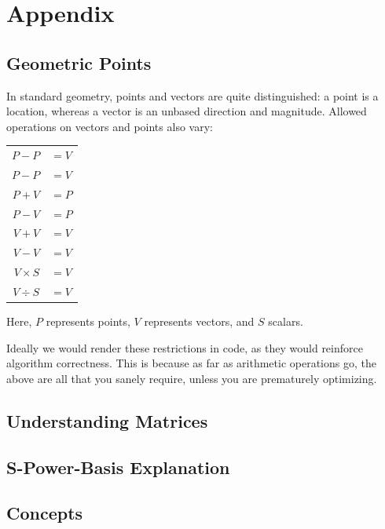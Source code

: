 \documentclass[openany]{book}
\begin{document}
\chapter{Appendix}
\renewcommand{\thesection}{\Alph{section}}

\section{Geometric Points}
In standard geometry, points and vectors are quite distinguished: a
point is a location, whereas a vector is an unbased direction and
magnitude.  Allowed operations on vectors and points also vary:

\begin{tabular}{r l}
  $P - P$ & $= V$ \\

  $P - P$ & $= V$ \\

  $P + V$ & $= P$ \\

  $P - V$ & $= P$ \\

  $V + V$ & $= V$ \\

  $V - V$ & $= V$ \\

  $V \times S$ & $= V$ \\

  $V \div S$ & $= V$ \\
\end{tabular}

Here, $P$ represents points, $V$ represents vectors, and $S$ scalars.

Ideally we would render these restrictions in code, as they would
reinforce algorithm correctness.  This is because as far as arithmetic
operations go, the above are all that you sanely require, unless you
are prematurely optimizing.

\section{Understanding Matrices}

\section{S-Power-Basis Explanation}

\section{Concepts}
\end{document}
